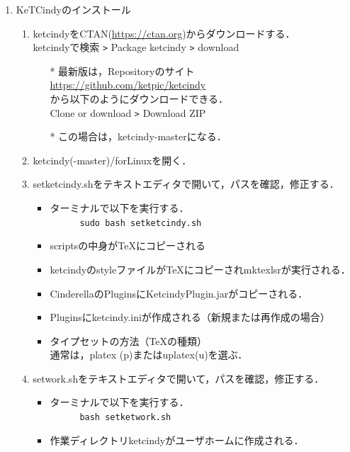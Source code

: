 \documentclass{ujarticle}
\begin{document}
\begin{enumerate}[\bf\large 1.]
\item KeTCindyのインストール
  \begin{enumerate}[(1)]
  \item ketcindyをCTAN(\url{https://ctan.org})からダウンロードする．\\
  \hspace*{10mm}ketcindyで検索 \verb|>| Package ketcindy \verb|>| download
    \begin{itemize}
    \item[*]最新版は，Repositoryのサイト\\
        \hspace*{10mm}\url{https://github.com/ket­pic/ketcindy}\\
       から以下のようにダウンロードできる．\\
        \hspace*{10mm}Clone or download \verb|>| Download ZIP
    \item[*]この場合は，ketcindy-masterになる．
    \end{itemize}
  \item ketcindy(-master)/forLinuxを開く．
  \item setketcindy.shをテキストエディタで開いて，パスを確認，修正する．
    \begin{itemize}
    \item ターミナルで以下を実行する．\\
　　　\verb|sudo bash setketcindy.sh|
    \item scriptsの中身が\TeX にコピーされる
    \item ketcindyのstyleファイルが\TeX にコピーされmktexlsrが実行される．
    \item CinderellaのPluginsにKetcindyPlugin.jarがコピーされる．
    \item Pluginsにketcindy.iniが作成される（新規または再作成の場合）
    \item タイプセットの方法（TeXの種類）\\
    \hspace*{10mm}通常は，platex (p)またはuplatex(u)を選ぶ．
    \end{itemize}
  \item setwork.shをテキストエディタで開いて，パスを確認，修正する．
    \begin{itemize}
    \item ターミナルで以下を実行する．\\
　　　\verb|bash setketwork.sh|
    \item 作業ディレクトリketcindyがユーザホームに作成される．

\end{itemize}
\end{enumerate}
\end{enumerate}
\end{document}
